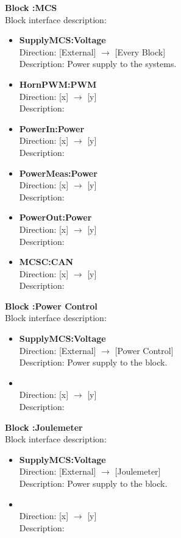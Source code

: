 \textbf{Block :MCS}\\
Block interface description:
\begin{itemize}
	\item \textbf{SupplyMCS:Voltage}\\
	Direction: [External] $\rightarrow$ [Every Block]\\
	Description: Power supply to the systems.
	\item \textbf{HornPWM:PWM}\\
	Direction: [x] $\rightarrow$ [y]\\
	Description:
	\item \textbf{PowerIn:Power}\\
	Direction: [x] $\rightarrow$ [y]\\
	Description:
	\item \textbf{PowerMeas:Power}\\
	Direction: [x] $\rightarrow$ [y]\\
	Description:
	\item \textbf{PowerOut:Power}\\
	Direction: [x] $\rightarrow$ [y]\\
	Description:
	\item \textbf{MCSC:CAN}\\
	Direction: [x] $\rightarrow$ [y]\\
	Description:
\end{itemize}

\textbf{Block :Power Control}\\
Block interface description:
\begin{itemize}
	\item \textbf{SupplyMCS:Voltage}\\
	Direction: [External] $\rightarrow$ [Power Control]\\
	Description: Power supply to the block.
	\item \textbf{}\\
	Direction: [x] $\rightarrow$ [y]\\
	Description:
\end{itemize}

\textbf{Block :Joulemeter}\\
Block interface description:
\begin{itemize}
	\item \textbf{SupplyMCS:Voltage}\\
	Direction: [External] $\rightarrow$ [Joulemeter]\\
	Description: Power supply to the block.
	\item \textbf{}\\
	Direction: [x] $\rightarrow$ [y]\\
	Description:
\end{itemize}

